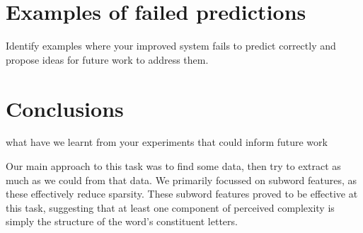\documentclass[11pt,a4paper]{article}
\begin{document}
\section{Examples of failed predictions}

Identify examples where your improved system fails to predict correctly and propose ideas for future work to address them.

\section{Conclusions}

what have we learnt from your experiments that could inform future work

Our main approach to this task was to find some data, then try to extract as much as we could from that data. We primarily focussed on subword features, as these effectively reduce sparsity. These subword features proved to be effective at this task, suggesting that at least one component of perceived complexity is simply the structure of the word's constituent letters.


%
%



\end{document}
